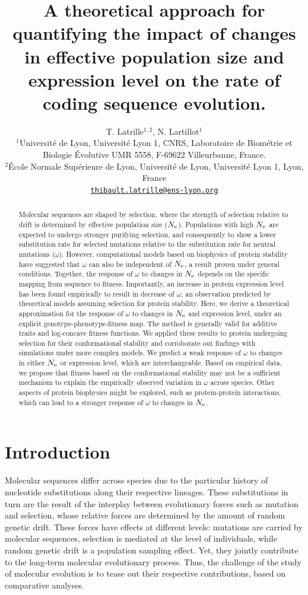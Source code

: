 \documentclass{article}
\title{A theoretical approach for quantifying the impact of changes in effective population size and expression level on the rate of coding sequence evolution.}
\author{
    \large
    T. {Latrille}$^{1,2}$, N. {Lartillot}$^{1}$ \\
    \normalsize
	$^{1}$Université de Lyon, Université Lyon 1, CNRS, Laboratoire de Biométrie et Biologie Évolutive UMR 5558, F-69622 Villeurbanne, France.\\
	$^{2}$École Normale Supérieure de Lyon, Université de Lyon, Université Lyon 1, Lyon, France\\
	\texttt{\href{mailto:thibault.latrille@ens-lyon.org}{thibault.latrille@ens-lyon.org}} \\
}
\begin{document}
\maketitle

\begin{abstract}
Molecular sequences are shaped by selection, where the strength of selection relative to drift is determined by effective population size ($N_{\text{e}}$).
Populations with high $N_{\text{e}}$ are expected to undergo stronger purifying selection, and consequently to show a lower substitution rate for selected mutations relative to the substitution rate for neutral mutations ($\omega$).
However, computational models based on biophysics of protein stability have suggested that $\omega$ can also be independent of $N_{\text{e}}$, a result proven under general conditions.
Together, the response of $\omega$ to changes in $N_{\text{e}}$ depends on the specific mapping from sequence to fitness.
Importantly, an increase in protein expression level has been found empirically to result in decrease of $\omega$, an observation predicted by theoretical models assuming selection for protein stability.
Here, we derive a theoretical approximation for the response of $\omega$ to changes in $N_{\text{e}}$ and expression level, under an explicit genotype-phenotype-fitness map.
The method is generally valid for additive traits and log-concave fitness functions.
We applied these results to protein undergoing selection for their conformational stability and corroborate out findings with simulations under more complex models.
We predict a weak response of $\omega$ to changes in either $N_{\text{e}}$ or expression level, which are interchangeable.
Based on empirical data, we propose that fitness based on the conformational stability may not be a sufficient mechanism to explain the empirically observed variation in $\omega$ across species.
Other aspects of protein biophysics might be explored, such as protein-protein interactions, which can lead to a stronger response of $\omega$ to changes in $N_{\text{e}}$.
\end{abstract}


\section{Introduction}
Molecular sequences differ across species due to the particular history of nucleotide {substitutions} along their respective lineages.
These {substitutions} in turn are the result of the interplay between evolutionary forces such as mutation and selection, whose relative forces are determined by the amount of random {genetic drift}.
These forces have effects at different levels: mutations are carried by molecular sequences, selection is mediated at the level of individuals, while random {genetic drift} is a population sampling effect.
Yet, they jointly contribute to the long-term molecular evolutionary process.
Thus, the challenge of the study of molecular evolution is to tease out their respective contributions, based on comparative analyses.
\end{document}
